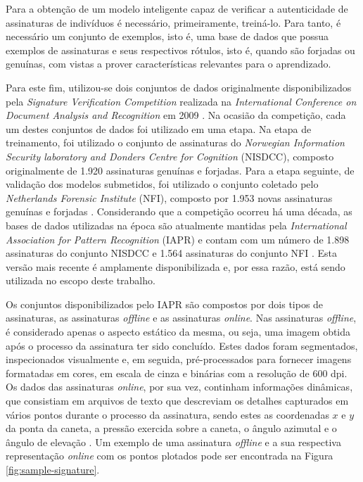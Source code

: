 Para a obtenção de um modelo inteligente capaz de verificar a autenticidade de assinaturas de indivíduos é necessário, primeiramente, treiná-lo. Para tanto, é necessário um conjunto de exemplos, isto é, uma base de dados  que possua exemplos de assinaturas e seus respectivos rótulos, isto é, quando são forjadas ou genuínas, com vistas a prover características relevantes para o aprendizado.

Para este fim, utilizou-se dois conjuntos de dados originalmente disponibilizados pela
\emph{Signature Verification Competition} realizada na \emph{International Conference on Document Analysis and Recognition} em 2009 \cite{iapr-tc11}. Na ocasião da competição, cada um destes conjuntos de dados foi utilizado em uma etapa. Na etapa de treinamento, foi utilizado o conjunto de assinaturas do \emph{Norwegian Information Security laboratory and Donders Centre for Cognition} (NISDCC), composto originalmente de 1.920 assinaturas genuínas e forjadas. Para a etapa seguinte, de validação dos modelos submetidos, foi utilizado o conjunto coletado pelo \emph{Netherlands Forensic Institute} (NFI), composto por 1.953 novas assinaturas genuínas e forjadas \cite{icdar2009}. Considerando que a competição ocorreu há uma década, as bases de dados utilizadas na época são atualmente mantidas pela \emph{International Association for Pattern Recognition} (IAPR) e contam com um número de 1.898 assinaturas do conjunto NISDCC e 1.564 assinaturas do conjunto NFI \cite{iapr-tc11}. Esta versão mais recente é amplamente disponibilizada e, por essa razão, está sendo utilizada no escopo deste trabalho.

Os conjuntos disponibilizados pelo IAPR são compostos por dois tipos de assinaturas, as assinaturas \emph{offline} e as assinaturas \emph{online}. Nas assinaturas \emph{offline}, é considerado apenas o aspecto estático da mesma, ou seja, uma imagem obtida após o processo da assinatura ter sido concluído. Estes dados foram segmentados, inspecionados visualmente e, em seguida, pré-processados para fornecer imagens formatadas em cores, em escala de cinza e binárias com a resolução de $600$ dpi. Os dados das assinaturas \emph{online}, por sua vez, continham informações dinâmicas, que consistiam em arquivos de texto que descreviam os detalhes capturados em vários pontos durante o processo da assinatura, sendo estes as coordenadas $x$ e $y$ da ponta da caneta, a pressão exercida sobre a caneta, o ângulo azimutal e o ângulo de elevação \cite{icdar2009}. Um exemplo de uma assinatura \emph{offline} e a sua respectiva representação \emph{online} com os pontos plotados pode ser encontrada na Figura \ref{fig:sample-signature}.



